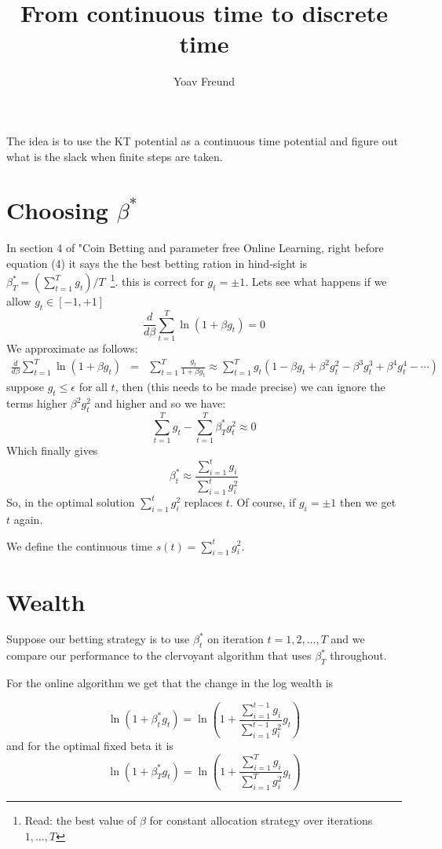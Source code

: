 \documentclass{article}
\title{From continuous time to discrete time}
\author{Yoav Freund}
\begin{document}
\maketitle

\renewcommand{\log}{\mbox{log}_2}

The idea is to use the KT potential as a continuous time potential and figure out what is the slack when finite steps are taken.

\section{Choosing $\beta^*$}

In section 4 of "Coin Betting and parameter free Online Learning, right before equation (4) it says the the best betting ration in
hind-sight is $\beta_T^* = \left( \sum_{t=1}^T g_t\right)/T$~\footnote{Read: the best value of $\beta$ for constant allocation strategy over iterations $1,\ldots,T$}. this is correct for $g_t = \pm 1$. Lets see what happens if we allow $g_t \in [-1,+1]$
\[
\frac{d}{d\beta} \sum_{t=1}^T \ln(1+\beta g_t) = 0
\]
We approximate as follows:
\begin{eqnarray*}
\frac{d}{d\beta} \sum_{t=1}^T \ln(1+\beta g_t) 
&=& \sum_{t=1}^T \frac{g_t}{1+\beta g_t} 
\approx \sum_{t=1}^T g_t \left( 1-\beta g_t +\beta^2 g_t^2 -\beta^3 g_t^3 + \beta^4 g_t^4-\cdots \right)
\end{eqnarray*}
suppose $g_t \leq \epsilon$ for all $t$, then (this needs to be made precise) we can ignore the terms higher $\beta^2 g_t^2$ and higher and so we have:
\[
\sum_{t=1}^T g_t - \sum_{t=1}^T \beta^*_T g_t^2 \approx 0
\]
Which finally gives
\[
\beta_t^* \approx \frac{\sum_{i=1}^t g_i}{\sum_{i=1}^t g_i^2}
\]
So, in the optimal solution $\sum_{i=1}^t g_i^2$ replaces $t$. Of course, if $g_i = \pm 1$ then we get $t$ again.

We define the continuous time $s(t) = \sum_{i=1}^t g_i^2$. 

\section{Wealth}
Suppose our betting strategy is to use $\beta_t^*$ on iteration $t=1,2,\ldots,T$ and we compare our performance to the clervoyant algorithm that uses $\beta_T^*$  throughout.

For the online algorithm we get that the change in the log wealth is 

$$
\ln (1+\beta^*_t g_t) = \ln\left(1+ \frac{\sum_{i=1}^{t-1} g_i}{\sum_{i=1}^{t-1} g_i^2} g_t\right)
$$
and for the optimal fixed beta it is
$$
\ln (1+\beta^*_T g_t) = \ln\left(1+ \frac{\sum_{i=1}^{T} g_i}{\sum_{i=1}^{T} g_i^2} g_t\right)
$$
\end{document}
